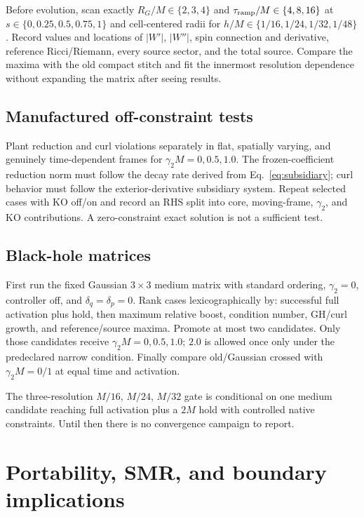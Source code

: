 \documentclass[11pt]{article}
\begin{document}
Before evolution, scan exactly $R_G/M\in\{2,3,4\}$ and
$\tau_{\rm ramp}/M\in\{4,8,16\}$ at
$s\in\{0,0.25,0.5,0.75,1\}$ and cell-centered radii for
$h/M\in\{1/16,1/24,1/32,1/48\}$.  Record values and locations of $|W'|$,
$|W''|$, spin connection and derivative, reference Ricci/Riemann, every source
sector, and the total source.  Compare the maxima with the old compact stitch
and fit the innermost resolution dependence without expanding the matrix after
seeing results.

\subsection{Manufactured off-constraint tests}

Plant reduction and curl violations separately in flat, spatially varying,
and genuinely time-dependent frames for $\gamma_2M=0,0.5,1.0$.  The
frozen-coefficient reduction norm must follow the decay rate derived from
Eq.~\eqref{eq:subsidiary}; curl behavior must follow the exterior-derivative
subsidiary system.  Repeat selected cases with KO off/on and record an RHS
split into core, moving-frame, $\gamma_2$, and KO contributions.  A
zero-constraint exact solution is not a sufficient test.

\subsection{Black-hole matrices}

First run the fixed Gaussian $3\times3$ medium matrix with standard ordering,
$\gamma_2=0$, controller off, and $\delta_q=\delta_p=0$.  Rank cases
lexicographically by: successful full activation plus hold, then maximum
relative boost, condition number, GH/curl growth, and reference/source maxima.
Promote at most two candidates.  Only those candidates receive
$\gamma_2M=0,0.5,1.0$; $2.0$ is allowed once only under the predeclared narrow
condition.  Finally compare old/Gaussian crossed with $\gamma_2M=0/1$ at equal
time and activation.

The three-resolution $M/16$, $M/24$, $M/32$ gate is conditional on one medium
candidate reaching full activation plus a $2M$ hold with controlled native
constraints.  Until then there is no convergence campaign to report.

\section{Portability, SMR, and boundary implications}
\end{document}
